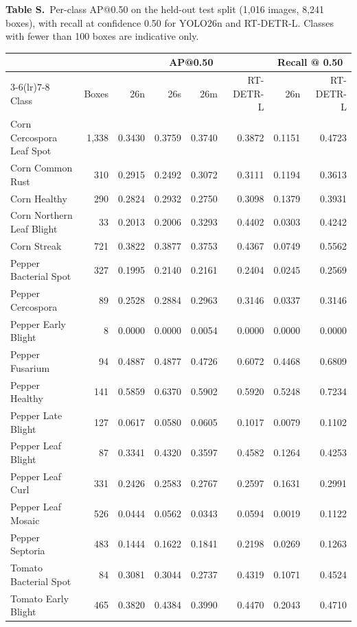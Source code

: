 \documentclass[preprint,12pt,authoryear]{elsarticle}
\newcommand{\tablehead}[2]{%
  \par\addvspace{\bigskipamount}%
  \needspace{12\baselineskip}%
  \refstepcounter{table}\label{#1}%
  {\footnotesize\noindent\textbf{Table \thetable.}~#2\par}%
  \nopagebreak\addvspace{4pt}\nopagebreak}
\renewcommand{\thetable}{S\arabic{table}}
\begin{document}
\tablehead{tab:S3}{Per-class AP@0.50 on the held-out test split (1{,}016 images, 8{,}241 boxes), with recall at confidence 0.50 for YOLO26n and RT-DETR-L. Classes with fewer than 100 boxes are indicative only.}
\begin{center}
\footnotesize
\setlength{\tabcolsep}{4pt}
\begin{tabular}{l r r r r r r r}
\toprule
 & & \multicolumn{4}{c}{AP@0.50} & \multicolumn{2}{c}{Recall @ 0.50} \\
\cmidrule(lr){3-6}\cmidrule(lr){7-8}
Class & Boxes & 26n & 26s & 26m & RT-DETR-L & 26n & RT-DETR-L \\
\midrule
Corn Cercospora Leaf Spot & 1{,}338 & 0.3430 & 0.3759 & 0.3740 & 0.3872 & 0.1151 & 0.4723 \\
Corn Common Rust & 310 & 0.2915 & 0.2492 & 0.3072 & 0.3111 & 0.1194 & 0.3613 \\
Corn Healthy & 290 & 0.2824 & 0.2932 & 0.2750 & 0.3098 & 0.1379 & 0.3931 \\
Corn Northern Leaf Blight & 33 & 0.2013 & 0.2006 & 0.3293 & 0.4402 & 0.0303 & 0.4242 \\
Corn Streak & 721 & 0.3822 & 0.3877 & 0.3753 & 0.4367 & 0.0749 & 0.5562 \\
Pepper Bacterial Spot & 327 & 0.1995 & 0.2140 & 0.2161 & 0.2404 & 0.0245 & 0.2569 \\
Pepper Cercospora & 89 & 0.2528 & 0.2884 & 0.2963 & 0.3146 & 0.0337 & 0.3146 \\
Pepper Early Blight & 8 & 0.0000 & 0.0000 & 0.0054 & 0.0000 & 0.0000 & 0.0000 \\
Pepper Fusarium & 94 & 0.4887 & 0.4877 & 0.4726 & 0.6072 & 0.4468 & 0.6809 \\
Pepper Healthy & 141 & 0.5859 & 0.6370 & 0.5902 & 0.5920 & 0.5248 & 0.7234 \\
Pepper Late Blight & 127 & 0.0617 & 0.0580 & 0.0605 & 0.1017 & 0.0079 & 0.1102 \\
Pepper Leaf Blight & 87 & 0.3341 & 0.4320 & 0.3597 & 0.4582 & 0.1264 & 0.4253 \\
Pepper Leaf Curl & 331 & 0.2426 & 0.2583 & 0.2767 & 0.2597 & 0.1631 & 0.2991 \\
Pepper Leaf Mosaic & 526 & 0.0444 & 0.0562 & 0.0343 & 0.0594 & 0.0019 & 0.1122 \\
Pepper Septoria & 483 & 0.1444 & 0.1622 & 0.1841 & 0.2198 & 0.0269 & 0.1263 \\
Tomato Bacterial Spot & 84 & 0.3081 & 0.3044 & 0.2737 & 0.4319 & 0.1071 & 0.4524 \\
Tomato Early Blight & 465 & 0.3820 & 0.4384 & 0.3990 & 0.4470 & 0.2043 & 0.4710 \\

\end{tabular}
\end{center}
\end{document}
